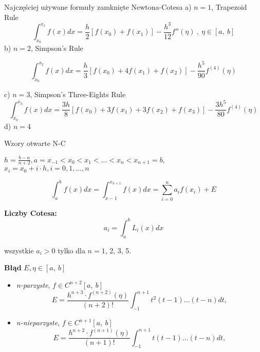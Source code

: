 	\begin{frame}{Najczęściej używane formuły zamknięte Newtona-Cotesa}
		a) $n=1$, Trapezoid Rule
        $$
          \int_{x_{0}}^{x_{1}}f(x)dx=\frac{h}{2}[f(x_{0})+f(x_{1})]-\frac{h^{3}}{12}f''(\eta)\ ,\ \eta\in[a,\ b]
        $$
        b) $n=2$, Simpson's Rule
      
        $$
          \int_{x_{0}}^{x_{2}}f(x)dx=\frac{h}{3}[f(x_{0})+4f(x_{1})+f(x_{2})]-\frac{h^{5}}{90}f^{(4)}(\eta)
        $$
        
	\end{frame}          
	\begin{frame}
        c) $n=3$, Simpson's Three-Eights Rule
        $$
          \int_{x_{0}}^{x_{3}}f(x)dx=\frac{3h}{8}[f(x_{0})+3f(x_{1})+3f(x_{2})+f(x_{3})]-\frac{3h^{5}}{80}f^{(4)}(\eta)
        $$
        d) $n=4$\newline\newline
	\end{frame}
	\begin{frame}{Wzory otwarte N-C}
		
$h=\frac{b-a}{n+2}, a=x_{-1}<x_{0}<x_{1}<\ldots<x_{n}<x_{n+1}=b,$\\
$x_{i}=x_{0}+i\cdot h, i=0, 1,\ldots,n$

   	$$
    \int_{a}^{b}f(x)dx=\int_{x-1}^{x_{n+1}}f(x)dx=\sum_{i=0}^{n}a_{i}f(x_{i})+E
    $$
    
\textbf{Liczby Cotesa:} $$a_{i}=\int_{a}^{b}L_{i}(x)dx$$

wszystkie $a_{i}>0$ tylko dla $n=1$, 2, 3, 5.

	\end{frame}
	\begin{frame}
	
	\textbf{Błąd} $E, \eta\in[a,\ b]$
	\begin{itemize}
	\item {\it n-parzyste}, $f\in C^{n+2}[a,\ b]$
     $$
		E= \frac{h^{n+3}\cdot f^{(n+2)}(\eta)}{(n+2)!}\int_{-1}^{n+1}t^{2}(t-1)\ldots(t-n)dt,
    $$
    \item {\it n-nieparzyste}, $f\in C^{n+1}[a,\ b]$
    $$
		E= \frac{h^{n+2}\cdot f^{(n+1)}(\eta)}{(n+1)!}\int_{-1}^{n+1}t(t-1)\ldots(t-n)dt,
    $$
	\end{itemize}
	\end{frame}
